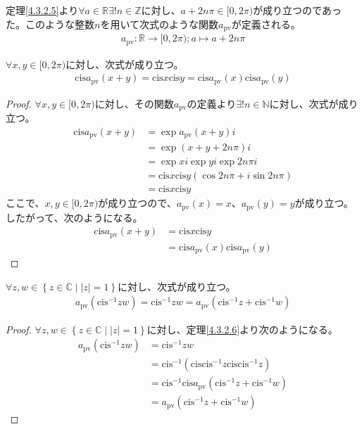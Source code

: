 \documentclass[dvipdfmx]{jsarticle}
\begin{document}
\begin{dfn} 定理\ref{4.3.2.5}より$\forall a \in \mathbb{R}\exists!n \in \mathbb{Z}$に対し、$a + 2n\pi \in [ 0,2\pi)$が成り立つのであった。このような整数$n$を用いて次式のような関数$a_{\mathrm{pv}}$が定義される。
\begin{align*}
a_{\mathrm{pv}}:\mathbb{R} \rightarrow [ 0,2\pi);a \mapsto a + 2n\pi
\end{align*}
\end{dfn}
\begin{thm}\label{4.3.2.6} $\forall x,y \in [ 0,2\pi)$に対し、次式が成り立つ。
\begin{align*}
{\mathrm{cis}}{a_{\mathrm{pv}}(x + y)} = {\mathrm{cis}}x{\mathrm{cis}}y = {\mathrm{cis}}{a_{\mathrm{pv}}(x)}{\mathrm{cis}}{a_{\mathrm{pv}}(y)}
\end{align*}
\end{thm}
\begin{proof}
$\forall x,y \in [ 0,2\pi)$に対し、その関数$a_{\mathrm{pv}}$の定義より$\exists!n \in \mathbb{N}$に対し、次式が成り立つ。
\begin{align*}
{\mathrm{cis}}{a_{\mathrm{pv}}(x + y)} &= \exp{a_{\mathrm{pv}}(x + y)i}\\
&= \exp{(x + y + 2n\pi)i}\\
&= \exp{xi}\exp{yi}\exp{2n\pi i}\\
&= {\mathrm{cis}}x{\mathrm{cis}}y\left( \cos{2n\pi} + i\sin{2n\pi} \right)\\
&= {\mathrm{cis}}x{\mathrm{cis}}y
\end{align*}
ここで、$x,y \in [ 0,2\pi)$が成り立つので、$a_{\mathrm{pv}}(x) = x$、$a_{\mathrm{pv}}(y) = y$が成り立つ。したがって、次のようになる。
\begin{align*}
{\mathrm{cis}}{a_{\mathrm{pv}}(x + y)} &= {\mathrm{cis}}x{\mathrm{cis}}y\\
&= {\mathrm{cis}}{a_{\mathrm{pv}}(x)}{\mathrm{cis}}{a_{\mathrm{pv}}(y)}
\end{align*}
\end{proof}
\begin{thm}\label{4.3.2.7}
$\forall z,w \in \left\{ z \in \mathbb{C} \middle| |z| = 1 \right\}$に対し、次式が成り立つ。
\begin{align*}
a_{\mathrm{pv}}\left( {\mathrm{cis}}^{- 1}{zw} \right) = {\mathrm{cis}}^{- 1}{zw} = a_{\mathrm{pv}}\left( {\mathrm{cis}}^{- 1}z + {\mathrm{cis}}^{- 1}w \right)
\end{align*}
\end{thm}
\begin{proof}
$\forall z,w \in \left\{ z \in \mathbb{C} \middle| |z| = 1 \right\}$に対し、定理\ref{4.3.2.6}より次のようになる。
\begin{align*}
a_{\mathrm{pv}}\left( {\mathrm{cis}}^{- 1}{zw} \right) &= {\mathrm{cis}}^{- 1}{zw}\\
&= {\mathrm{cis}}^{- 1}\left( {\mathrm{cis}}{{\mathrm{cis}}^{- 1}z}{\mathrm{cis}}{{\mathrm{cis}}^{- 1}z} \right)\\
&= {\mathrm{cis}}^{- 1}{{\mathrm{cis}}{a_{\mathrm{pv}}\left( {\mathrm{cis}}^{- 1}z + {\mathrm{cis}}^{- 1}w \right)}}\\
&= a_{\mathrm{pv}}\left( {\mathrm{cis}}^{- 1}z + {\mathrm{cis}}^{- 1}w \right)
\end{align*}
\end{proof}
\end{document}
